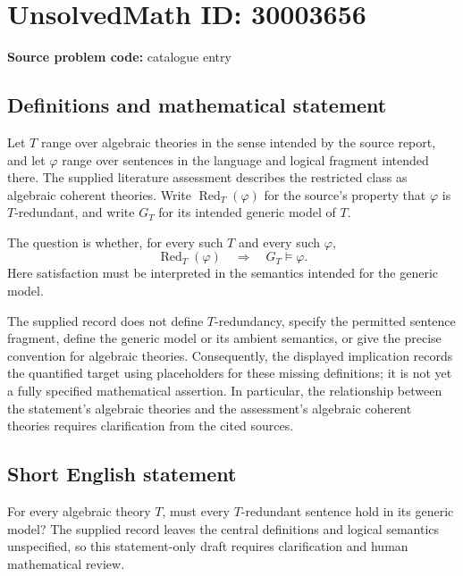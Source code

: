 \documentclass[11pt]{article}
\begin{document}
\section*{UnsolvedMath ID: 30003656}
\textbf{Source problem code:} catalogue entry
\subsection{Definitions and mathematical statement}
Let \(T\) range over algebraic theories in the sense intended by the source report, and let \(\varphi\) range over sentences in the language and logical fragment intended there. The supplied literature assessment describes the restricted class as algebraic coherent theories. Write \(\operatorname{Red}_T(\varphi)\) for the source's property that \(\varphi\) is \(T\)-redundant, and write \(G_T\) for its intended generic model of \(T\).

The question is whether, for every such \(T\) and every such \(\varphi\),
\[
\operatorname{Red}_T(\varphi)
\quad\Longrightarrow\quad
G_T\models\varphi.
\]
Here satisfaction must be interpreted in the semantics intended for the generic model.

The supplied record does not define \(T\)-redundancy, specify the permitted sentence fragment, define the generic model or its ambient semantics, or give the precise convention for algebraic theories. Consequently, the displayed implication records the quantified target using placeholders for these missing definitions; it is not yet a fully specified mathematical assertion. In particular, the relationship between the statement's algebraic theories and the assessment's algebraic coherent theories requires clarification from the cited sources.
\subsection{Short English statement}
For every algebraic theory \(T\), must every \(T\)-redundant sentence hold in its generic model? The supplied record leaves the central definitions and logical semantics unspecified, so this statement-only draft requires clarification and human mathematical review.
\end{document}
